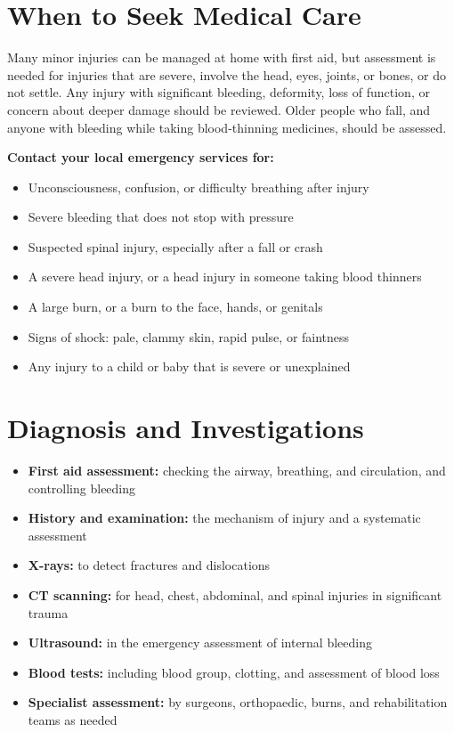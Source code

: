 \section*{When to Seek Medical Care}
Many minor injuries can be managed at home with first aid, but assessment is needed for injuries that are severe, involve the head, eyes, joints, or bones, or do not settle. Any injury with significant bleeding, deformity, loss of function, or concern about deeper damage should be reviewed. Older people who fall, and anyone with bleeding while taking blood-thinning medicines, should be assessed.

\textbf{Contact your local emergency services for:}
\begin{itemize}
    \item Unconsciousness, confusion, or difficulty breathing after injury
    \item Severe bleeding that does not stop with pressure
    \item Suspected spinal injury, especially after a fall or crash
    \item A severe head injury, or a head injury in someone taking blood thinners
    \item A large burn, or a burn to the face, hands, or genitals
    \item Signs of shock: pale, clammy skin, rapid pulse, or faintness
    \item Any injury to a child or baby that is severe or unexplained
\end{itemize}

\section*{Diagnosis and Investigations}
\begin{itemize}
    \item \textbf{First aid assessment:} checking the airway, breathing, and circulation, and controlling bleeding
    \item \textbf{History and examination:} the mechanism of injury and a systematic assessment
    \item \textbf{X-rays:} to detect fractures and dislocations
    \item \textbf{CT scanning:} for head, chest, abdominal, and spinal injuries in significant trauma
    \item \textbf{Ultrasound:} in the emergency assessment of internal bleeding
    \item \textbf{Blood tests:} including blood group, clotting, and assessment of blood loss
    \item \textbf{Specialist assessment:} by surgeons, orthopaedic, burns, and rehabilitation teams as needed
\end{itemize}

